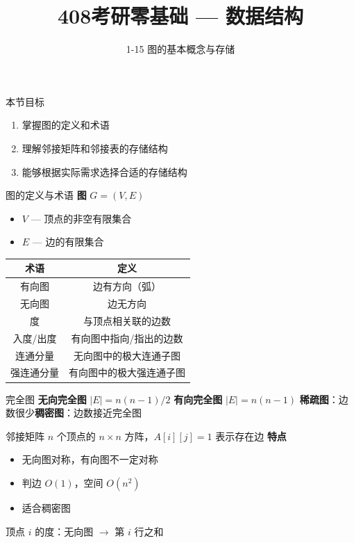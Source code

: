\documentclass[10pt, aspectratio=169]{beamer}
\title{408考研零基础 --- 数据结构}
\subtitle{1-15 图的基本概念与存储}
\author{}
\date{}
\begin{document}
\begin{frame}{本节目标}
\begin{enumerate}
\item 掌握图的定义和术语
\item 理解邻接矩阵和邻接表的存储结构
\item 能够根据实际需求选择合适的存储结构
\end{enumerate}
\end{frame}
\begin{frame}{图的定义与术语}
\textbf{图} $G=(V,E)$
\begin{itemize}
\item $V$ --- 顶点的非空有限集合
\item $E$ --- 边的有限集合
\end{itemize}
\vspace{0.3em}
\begin{tabular}{|c|c|}
\hline 术语 & 定义 \\ \hline
有向图 & 边有方向（弧） \\ \hline
无向图 & 边无方向 \\ \hline
度 & 与顶点相关联的边数 \\ \hline
入度/出度 & 有向图中指向/指出的边数 \\ \hline
连通分量 & 无向图中的极大连通子图 \\ \hline
强连通分量 & 有向图中的极大强连通子图 \\ \hline
\end{tabular}
\end{frame}
\begin{frame}{完全图}
\textbf{无向完全图} $|E|=n(n-1)/2$
\vspace{0.3em}
\textbf{有向完全图} $|E|=n(n-1)$
\vspace{0.5em}
\textbf{稀疏图}：边数很少\quad \textbf{稠密图}：边数接近完全图
\end{frame}
\begin{frame}{邻接矩阵}
$n$ 个顶点的 $n\times n$ 方阵，$A[i][j]=1$ 表示存在边
\vspace{0.3em}
\textbf{特点}
\begin{itemize}
\item 无向图对称，有向图不一定对称
\item 判边 $O(1)$，空间 $O(n^2)$
\item 适合稠密图
\end{itemize}
顶点 $i$ 的度：无向图 $\to$ 第 $i$ 行之和
\end{frame}
\end{document}
